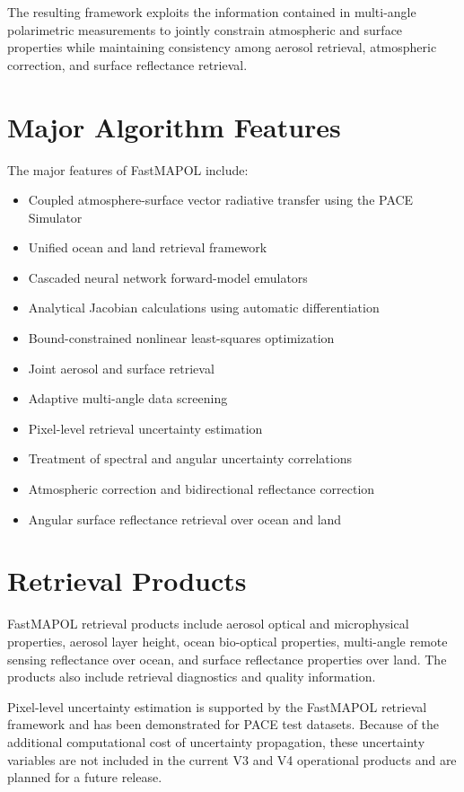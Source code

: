 \documentclass[
  11pt,
  letterpaper,
]{scrreprt}
\providecommand{\tightlist}{%
  \setlength{\itemsep}{0pt}\setlength{\parskip}{0pt}}
\begin{document}
The resulting framework exploits the information contained in
multi-angle polarimetric measurements to jointly constrain atmospheric
and surface properties while maintaining consistency among aerosol
retrieval, atmospheric correction, and surface reflectance retrieval.

\section{Major Algorithm Features}\label{major-algorithm-features}

The major features of FastMAPOL include:

\begin{itemize}
\tightlist
\item
  Coupled atmosphere-surface vector radiative transfer using the PACE
  Simulator
\item
  Unified ocean and land retrieval framework
\item
  Cascaded neural network forward-model emulators
\item
  Analytical Jacobian calculations using automatic differentiation
\item
  Bound-constrained nonlinear least-squares optimization
\item
  Joint aerosol and surface retrieval
\item
  Adaptive multi-angle data screening
\item
  Pixel-level retrieval uncertainty estimation
\item
  Treatment of spectral and angular uncertainty correlations
\item
  Atmospheric correction and bidirectional reflectance correction
\item
  Angular surface reflectance retrieval over ocean and land
\end{itemize}

\section{Retrieval Products}\label{retrieval-products}

FastMAPOL retrieval products include aerosol optical and microphysical
properties, aerosol layer height, ocean bio-optical properties,
multi-angle remote sensing reflectance over ocean, and surface
reflectance properties over land. The products also include retrieval
diagnostics and quality information.

Pixel-level uncertainty estimation is supported by the FastMAPOL
retrieval framework and has been demonstrated for PACE test datasets.
Because of the additional computational cost of uncertainty propagation,
these uncertainty variables are not included in the current V3 and V4
operational products and are planned for a future release.
\end{document}
